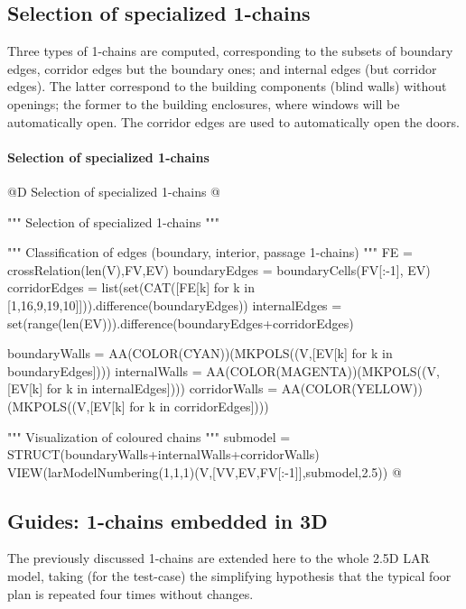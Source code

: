 \documentclass[11pt,oneside]{article}    %
\begin{document}
\subsection{Selection of specialized 1-chains}

Three types of 1-chains are computed, corresponding to the subsets of boundary edges, corridor edges but the boundary ones; and  internal edges (but corridor edges). The latter correspond to the building components (blind walls) without openings; the former to the building enclosures, where windows will be automatically open. The corridor edges are used to automatically open the doors.

\paragraph{Selection of specialized 1-chains}
@D Selection of specialized 1-chains
@{""" Selection of specialized 1-chains """

""" Classification of edges (boundary, interior, passage 1-chains) """
FE = crossRelation(len(V),FV,EV)
boundaryEdges = boundaryCells(FV[:-1], EV)
corridorEdges = list(set(CAT([FE[k] for k in [1,16,9,19,10]])).difference(boundaryEdges))
internalEdges = set(range(len(EV))).difference(boundaryEdges+corridorEdges)

boundaryWalls = AA(COLOR(CYAN))(MKPOLS((V,[EV[k] for k in boundaryEdges])))
internalWalls = AA(COLOR(MAGENTA))(MKPOLS((V,[EV[k] for k in internalEdges])))
corridorWalls = AA(COLOR(YELLOW))(MKPOLS((V,[EV[k] for k in corridorEdges])))

""" Visualization of coloured chains """
submodel = STRUCT(boundaryWalls+internalWalls+corridorWalls)
VIEW(larModelNumbering(1,1,1)(V,[VV,EV,FV[:-1]],submodel,2.5))
@}

\subsection{Guides: 1-chains embedded in 3D}

The previously discussed 1-chains are extended here to the whole 2.5D LAR model, taking (for the test-case) the simplifying hypothesis that the typical foor plan is repeated four times without changes.
\end{document}
